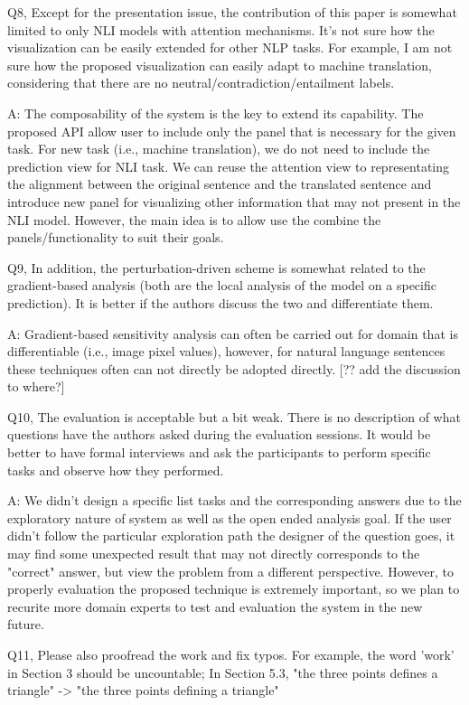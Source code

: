 Q8, Except for the presentation issue, the contribution of this paper is somewhat limited to only NLI models with attention mechanisms. It's not sure how the visualization can be easily extended for other NLP tasks. For example, I am not sure how the proposed visualization can easily adapt to machine translation, considering that there are no neutral/contradiction/entailment labels.

A: The composability of the system is the key to extend its capability. The proposed API allow user to include only the panel that is necessary for the given task. For new task (i.e., machine translation), we do not need to include the prediction view for NLI task. We can reuse the attention view to representating the alignment between the original sentence and the translated sentence and introduce new panel for visualizing other information that may not present in the NLI model. However, the main idea is to allow use the combine the panels/functionality to suit their goals.

Q9, In addition, the perturbation-driven scheme is somewhat related to the gradient-based analysis (both are the local analysis of the model on a specific prediction). It is better if the authors discuss the two and differentiate them.

A: Gradient-based sensitivity analysis can often be carried out for domain that is differentiable (i.e., image pixel values), however, for natural language sentences these techniques often can not directly be adopted directly. [?? add the discussion to where?]

Q10, The evaluation is acceptable but a bit weak. There is no description of what questions have the authors asked during the evaluation sessions. It would be better to have formal interviews and ask the participants to perform specific tasks and observe how they performed.

A: We didn't design a specific list tasks and the corresponding answers due to the exploratory nature of system as well as the open ended analysis goal. If the user didn't follow the particular exploration path the designer of the question goes, it may find some unexpected result that may not directly corresponds to the "correct" answer, but view the problem from a different perspective. However, to properly evaluation the proposed technique is extremely important, so we plan to recurite more domain experts to test and evaluation the system in the new future.

Q11, Please also proofread the work and fix typos. For example, the word 'work' in Section 3 should be uncountable; In Section 5.3, "the three points defines a triangle" -> "the three points defining a triangle"

